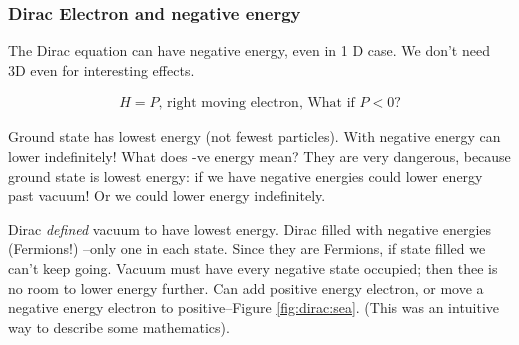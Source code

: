 \documentclass[]{article}
\begin{document}
\subsubsection{Dirac Electron  and negative energy}
The Dirac equation can have negative energy, even in 1 D case. We don't need 3D even for interesting effects.

\begin{align*}
	H=P \text{, right moving electron, What if $P<0$?}
\end{align*} 

Ground state has lowest energy (not fewest particles). With negative energy can lower indefinitely! What does -ve energy mean? They are very dangerous, because ground state is lowest energy: if we have negative energies could lower energy past vacuum! Or we could lower energy indefinitely. 

Dirac \emph{defined} vacuum to have lowest energy. Dirac filled with negative energies (Fermions!) --only one in each state. Since they are Fermions, if state filled we can't keep going. Vacuum must have every negative state occupied; then thee is no room to lower energy further. Can add positive energy electron, or move a negative energy electron to positive--Figure \ref{fig:dirac:sea}. (This was an intuitive way to describe some mathematics).
\end{document}
